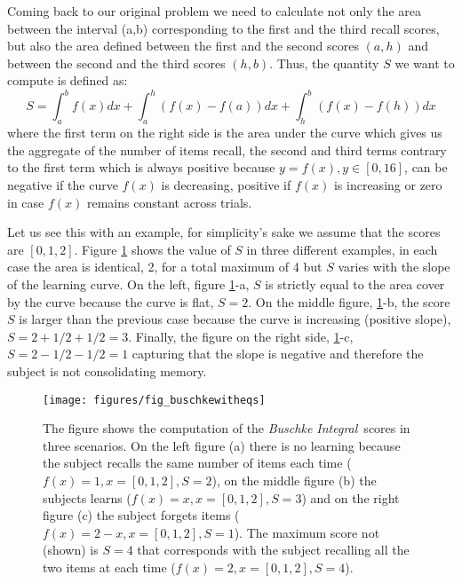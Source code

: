 \documentclass[9pt,twocolumn,twoside]{pnas-new}
\begin{document}
Coming back to our original problem we need to calculate not only the area between the interval (a,b) corresponding to the first and the third recall scores, but also the area defined between the first and the second scores $(a,h)$ and between the second and the third scores $(h,b)$.  
Thus, the quantity $S$ we want to compute is defined as:
\begin{equation}
S = \int_{a}^{b}f(x)dx + \int_{a}^{h}(f(x) - f(a))dx + \int_{h}^{b}(f(x)-f(h))dx
\label{eq:buchske}
\end{equation}
where the first term on the right side is the area under the curve which gives us the aggregate of the number of items recall, the second and third terms contrary to the first term which is always positive because $y =f(x), y \in [0,16]$, can be negative if the curve $f(x)$ is decreasing, positive if $f(x)$ is increasing or zero in case $f(x)$ remains constant across trials.

Let us see this with an example, for simplicity's sake we assume that the scores are $[0,1,2]$. Figure \ref{fig:b} shows the value of $S$ in three different examples, in each case the area is identical, 2, for a total maximum of 4 but $S$ varies with the slope of the learning curve. On the left, figure \ref{fig:b}-a,
$S$ is strictly equal to the area cover by the curve because the curve is flat, $S=2$. On the middle figure, \ref{fig:b}-b, the score $S$ is larger than the previous case because the curve is increasing (positive slope), $S=2+1/2+1/2=3$. Finally, the figure on the right side, \ref{fig:b}-c, $S=2-1/2-1/2=1$ capturing that the slope is negative and therefore the subject is not consolidating memory.      
  
\begin{figure}[H]
        \centering
        \texttt{[image: figures/fig\_buschkewitheqs]}
        \caption{The figure shows the computation of the \emph{Buschke Integral} scores in three scenarios. On the left figure (a) there is no learning because the subject recalls the same number of items each time ($f(x)=1, x=[0,1,2], S=2$), on the middle figure (b) the subjects learns ($f(x)=x, x=[0,1,2], S=3$) and on the right figure (c) the subject forgets items ($f(x)=2-x, x=[0,1,2], S=1$). The maximum score not (shown) is $S=4$ that corresponds with the subject recalling all the two items at each time ($f(x)=2, x=[0,1,2], S=4$).} 
        \label{fig:b}
\end{figure}
\end{document}
